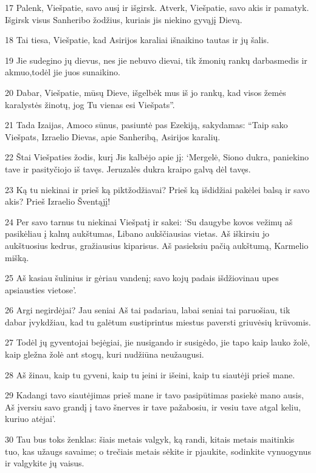 \par 17 Palenk, Viešpatie, savo ausį ir išgirsk. Atverk, Viešpatie, savo akis ir pamatyk. Išgirsk visus Sanheribo žodžius, kuriais jis niekino gyvąjį Dievą. 
\par 18 Tai tiesa, Viešpatie, kad Asirijos karaliai išnaikino tautas ir jų šalis. 
\par 19 Jie sudegino jų dievus, nes jie nebuvo dievai, tik žmonių rankų darbas­medis ir akmuo,­todėl jie juos sunaikino. 
\par 20 Dabar, Viešpatie, mūsų Dieve, išgelbėk mus iš jo rankų, kad visos žemės karalystės žinotų, jog Tu vienas esi Viešpats”. 
\par 21 Tada Izaijas, Amoco sūnus, pasiuntė pas Ezekiją, sakydamas: “Taip sako Viešpats, Izraelio Dievas, apie Sanheribą, Asirijos karalių. 
\par 22 Štai Viešpaties žodis, kurį Jis kalbėjo apie jį: ‘Mergelė, Siono dukra, paniekino tave ir pasityčiojo iš tavęs. Jeruzalės dukra kraipo galvą dėl tavęs. 
\par 23 Ką tu niekinai ir prieš ką piktžodžiavai? Prieš ką išdidžiai pakėlei balsą ir savo akis? Prieš Izraelio Šventąjį! 
\par 24 Per savo tarnus tu niekinai Viešpatį ir sakei: ‘Su daugybe kovos vežimų aš pasikėliau į kalnų aukštumas, Libano aukščiausias vietas. Aš iškirsiu jo aukštuosius kedrus, gražiausius kiparisus. Aš pasieksiu pačią aukštumą, Karmelio mišką. 
\par 25 Aš kasiau šulinius ir gėriau vandenį; savo kojų padais išdžiovinau upes apsiausties vietose’. 
\par 26 Argi negirdėjai? Jau seniai Aš tai padariau, labai seniai tai paruošiau, tik dabar įvykdžiau, kad tu galėtum sustiprintus miestus paversti griuvėsių krūvomis. 
\par 27 Todėl jų gyventojai bejėgiai, jie nusigando ir susigėdo, jie tapo kaip lauko žolė, kaip gležna žolė ant stogų, kuri nudžiūna neužaugusi. 
\par 28 Aš žinau, kaip tu gyveni, kaip tu įeini ir išeini, kaip tu siautėji prieš mane. 
\par 29 Kadangi tavo siautėjimas prieš mane ir tavo pasipūtimas pasiekė mano ausis, Aš įversiu savo grandį į tavo šnerves ir tave pažabosiu, ir vesiu tave atgal keliu, kuriuo atėjai’. 
\par 30 Tau bus toks ženklas: šiais metais valgyk, ką randi, kitais metais maitinkis tuo, kas užaugs savaime; o trečiais metais sėkite ir pjaukite, sodinkite vynuogynus ir valgykite jų vaisus. 
